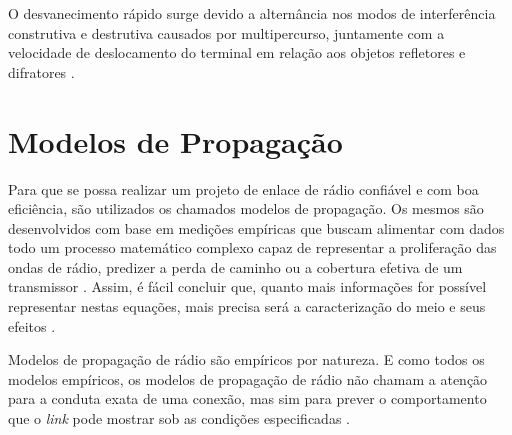 O desvanecimento rápido surge devido a alternância nos modos de interferência construtiva e destrutiva causados por multipercurso, juntamente com a velocidade de deslocamento do terminal em relação aos objetos refletores e difratores \cite{haykin2008}.

\begin{figure}[H]
	\centering
\end{figure}

\section{Modelos de Propagação}
\label{sec:modelos-propagacao}

Para que se possa realizar um projeto de enlace de rádio confiável e com boa eficiência, são utilizados os chamados modelos de propagação. Os mesmos são desenvolvidos com base em medições empíricas que buscam alimentar com dados todo um processo matemático complexo capaz de representar a proliferação das ondas de rádio, predizer a perda de caminho ou a cobertura efetiva de um transmissor \cite{akpaida2018,najnudel2004}. Assim, é fácil concluir que, quanto mais informações for possível representar nestas equações, mais precisa será a caracterização do meio e seus efeitos \cite{akpaida2018}.

Modelos de propagação de rádio são empíricos por natureza. E como todos os modelos empíricos, os modelos de propagação de rádio não chamam a atenção para a conduta exata de uma conexão, mas sim para prever o comportamento que o \textit{link} pode mostrar sob as condições especificadas \cite{akpaida2018}.

